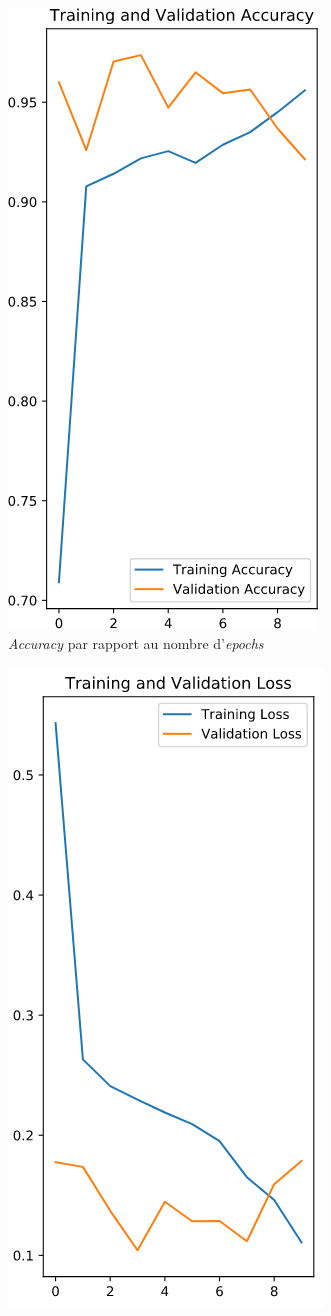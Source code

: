 \documentclass[french]{article}
\theoremstyle{mytheoremstyle}
\theoremstyle{mytheoremstyle}
\theoremstyle{myproblemstyle}
\begin{document}
    \begin{figure}[H]
    \centering
    \begin{subfigure}[t]{0.5\textwidth}
            \centering
            \includegraphics[width=0.5\linewidth]{images/cnn_acc_loss_1.png}
            \caption{\emph{Accuracy} par rapport au nombre d'\emph{epochs}}
    \end{subfigure}%
    \begin{subfigure}[t]{0.5\textwidth}
            \centering
            \includegraphics[width=0.5\linewidth]{images/cnn_acc_loss_2.png}

\end{subfigure}
\end{figure}
\end{document}
